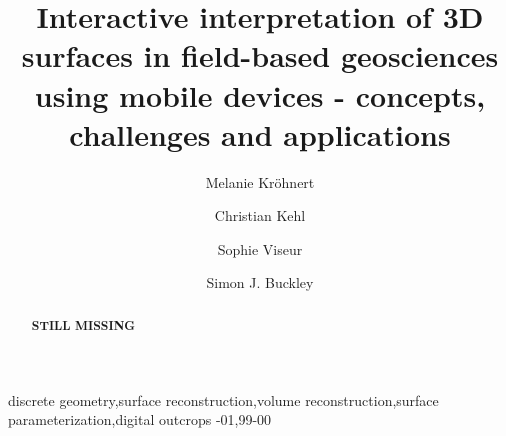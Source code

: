\documentclass[review]{elsarticle}
\begin{document}
\setlength\emergencystretch{1.5em}

\begin{frontmatter}

\title{Interactive interpretation of 3D surfaces in field-based geosciences using mobile devices - concepts, challenges and applications}



\author[tudresden]{Melanie Kr\"{o}hnert}

\author[anonymous]{Christian Kehl}


\author[cerege]{Sophie Viseur}

\author[uniresearch,uib]{Simon J. Buckley}


\address[tudresden]{Institute for Photogrammetry \& Remote Sensing, TU Dresden, Helmholtzstr. 10, 01069 Dresden, Germany}
\address[anonymous]{anonymous}
\address[cerege]{Aix-Marseille Universit\'{e}, CNRS, IRD, \gls{CEREGE} UM 34, Dept. Sedimentary and Reservoir Systems, 13001 Marseille, France}
\address[uniresearch]{Uni Research AS -- CIPR, Nyg{\aa}rdsgaten 112, 5008 Bergen, Norway}
\address[uib]{Department of Earth Science, University of Bergen, All\'{e}gaten 41, 5007 Bergen, Norway}


\begin{abstract}
\textbf{STILL MISSING}
\end{abstract}



\begin{keyword}
discrete geometry\sep surface reconstruction\sep volume reconstruction\sep surface parameterization\sep digital outcrops
-01\sep  99-00
\end{keyword}

\end{frontmatter}
\end{document}
